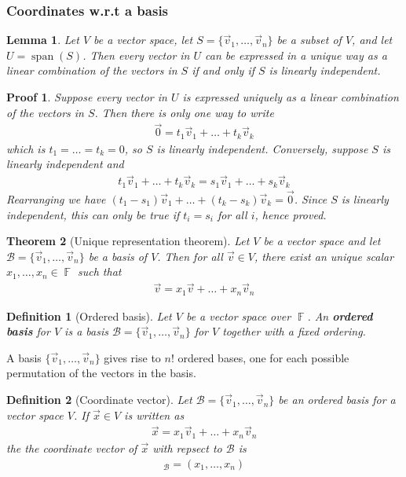 \documentclass[10pt]{article}
\DeclareMathOperator{\F}{{\mathbb{F}}}
\DeclareMathOperator{\spn}{span}
\theoremstyle{break}
\newtheorem{thm}{Theorem}[subsection]
\newtheorem{lem}[thm]{Lemma}
\newtheorem*{pf}{Proof}
\newtheorem{defn}{Definition}[subsection]
\begin{document}
\subsubsection*{Coordinates w.r.t a basis}
\begin{lem}
    Let $V$ be a vector space, let $S = \{\vec{v}_1, \dots, \vec{v}_n\}$ be a subset of $V$, and let $U = \spn(S)$. Then every vector in $U$ can be expressed in a unique way as a linear combination of the vectors in $S$ if and only if $S$ is linearly independent.
\end{lem}
\begin{pf}
    Suppose every vector in $U$ is expressed uniquely as a linear combination of the vectors in $S$. Then there is only one way to write
    \begin{align*}
        \vec{0} = t_1\vec{v}_1 + \dots + t_k\vec{v}_k
    \end{align*}
    which is $t_1 = \dots = t_k = 0$, so $S$ is linearly independent. Conversely, suppose $S$ is linearly independent and 
    \begin{align*}
        t_1\vec{v}_1 + \dots + t_k\vec{v}_k = s_1\vec{v}_1 + \dots + s_k\vec{v}_k
    \end{align*}
    Rearranging we have $(t_1 - s_1)\vec{v}_1 + \dots + (t_k - s_k)\vec{v}_k = \vec{0}$. Since $S$ is linearly independent,
    this can only be true if $t_i = s_i$ for all $i$, hence proved.
\end{pf}
\begin{thm}[Unique representation theorem]
    Let $V$ be a vector space and let $\mathcal{B} = \{\vec{v}_1, \dots, \vec{v}_n\}$ be a basis of $V$. Then for all $\vec{v} \in V$, there exist an unique scalar $x_1, \dots, x_n \in \F$ such that
    \begin{align*}
        \vec{v} = x_1\vec{v} + \dots + x_n\vec{v}_n
    \end{align*}    
\end{thm}
\begin{defn}[Ordered basis]
    Let $V$ be a vector space over $\F$. An \textbf{ordered basis} for $V$ is a basis $\mathcal{B} = \{\vec{v}_1, \dots, \vec{v}_n\}$ for $V$ together with a fixed ordering.
\end{defn} 
A basis $\{\vec{v}_1, \dots, \vec{v}_n\}$ gives rise to $n!$ ordered bases, one for each possible permutation of the vectors in the basis.
\begin{defn}[Coordinate vector]
    Let $\mathcal{B} = \{\vec{v}_1, \dots, \vec{v}_n\}$ be an ordered basis for a vector space $V$. If $\vec{x} \in V$ is written as 
    \begin{align*}
        \vec{x} = x_1\vec{v}_1 + \dots + x_n\vec{v}_n
    \end{align*}
    the the coordinate vector of $\vec{x}$ with repsect to $\mathcal{B}$ is 
    \begin{align*}
        [\vec{x}]_{\mathcal{B}} = (x_1, \dots, x_n)
    \end{align*}
\end{defn}
\end{document}
